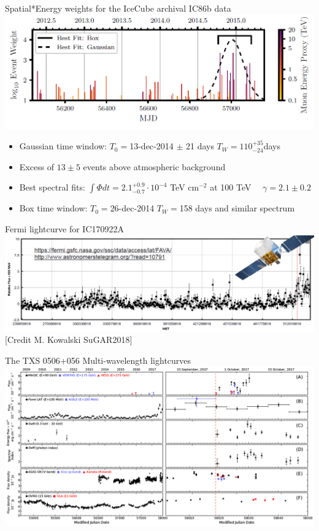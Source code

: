 \Tr
\onecolumn
\begin{center}
{\blue Spatial*Energy weights for the IceCube archival IC86b data}\\[3mm]
\includegraphics[keepaspectratio,width=24cm]{txs-time-dependent-IC86b}
\end{center}
%
\begin{itemize}
\item Gaussian time window: $T_{0}=$13-dec-2014 $\pm$ 21 days $T_{W}=110^{+35}_{-24}$days
\item Excess of $13 \pm 5$ events above atmospheric background 
\item Best spectral fits: $\int \Phi dt=2.1^{+0.9}_{-0.7} \cdot 10^{-4}$ TeV cm$^{-2}$ at 100 TeV $\quad \gamma=2.1 \pm 0.2$
\item Box time window: $T_{0}=$26-dec-2014 $T_{W}=$158 days and similar spectrum
\end{itemize}

\Tr
\onecolumn
\begin{center}
{\blue Fermi lightcurve for IC170922A}\\[3mm]
\includegraphics[keepaspectratio,width=25cm]{IC170922A-Fermi}\\
{\large [Credit M. Kowalski SuGAR2018]}
\end{center}

\Tr
\onecolumn
\begin{center}
{\blue The TXS 0506+056 Multi-wavelength lightcurves}\\[3mm]
\includegraphics[keepaspectratio,width=26cm]{txs-mw-lightcurves}
\end{center}

